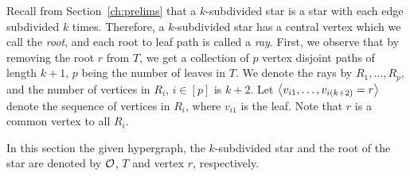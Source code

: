 Recall from Section~\ref{ch:prelims} that a $k$-subdivided star is a
star with each edge subdivided $k$ times. Therefore, a $k$-subdivided
star has a central vertex which we call the {\em root}, and each root
to leaf path is called a {\em ray}. First, we observe that by removing
the root $r$ from $T$, we get a collection of $p$ vertex disjoint
paths of length $k+1$, $p$ being the number of leaves in $T$.  We
denote the rays by $R_1, \ldots, R_p$, and the number of vertices in
$R_i$, $i \in [p]$ is $k+2$.  Let $\left\langle v_{i1},\ldots,v_{i(k+2)}=r \right\rangle$
denote the sequence of vertices in $R_i$, where $v_{i1}$ is the
leaf. Note that $r$ is a common vertex to all $R_i$.

In this section the given hypergraph, the $k$-subdivided star and the
root of the star are denoted by ${\cal O}$, $T$ and vertex $r$,
respectively.

